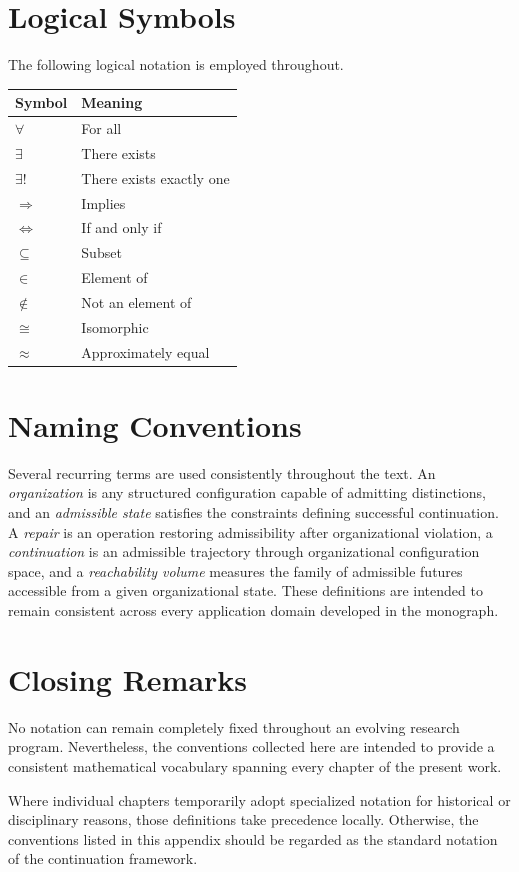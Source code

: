 \documentclass[11pt,oneside]{book}
\numberwithin{equation}{chapter}
\theoremstyle{definition}
\theoremstyle{plain}
\begin{document}
\section{Logical Symbols}

The following logical notation is employed throughout.

\begin{center}
\begin{tabular}{ll}
\toprule
Symbol & Meaning\\
\midrule
$\forall$ & For all\\
$\exists$ & There exists\\
$\exists !$ & There exists exactly one\\
$\Rightarrow$ & Implies\\
$\Leftrightarrow$ & If and only if\\
$\subseteq$ & Subset\\
$\in$ & Element of\\
$\notin$ & Not an element of\\
$\cong$ & Isomorphic\\
$\approx$ & Approximately equal\\
\bottomrule
\end{tabular}
\end{center}

\section{Naming Conventions}

Several recurring terms are used consistently throughout the text. An \emph{organization} is any structured configuration capable of admitting distinctions, and an \emph{admissible state} satisfies the constraints defining successful continuation. A \emph{repair} is an operation restoring admissibility after organizational violation, a \emph{continuation} is an admissible trajectory through organizational configuration space, and a \emph{reachability volume} measures the family of admissible futures accessible from a given organizational state. These definitions are intended to remain consistent across every application domain developed in the monograph.

\section{Closing Remarks}

No notation can remain completely fixed throughout an evolving research
program. Nevertheless, the conventions collected here are intended to
provide a consistent mathematical vocabulary spanning every chapter of
the present work.

Where individual chapters temporarily adopt specialized notation for
historical or disciplinary reasons, those definitions take precedence
locally. Otherwise, the conventions listed in this appendix should be
regarded as the standard notation of the continuation framework.
\end{document}
